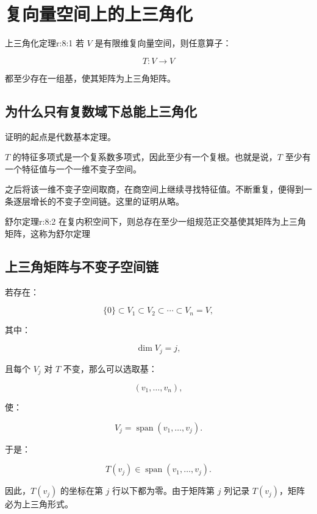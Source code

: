 
\chapter{复向量空间上的上三角化}


\begin{jthm}{上三角化定理}{r:8:1}
若 $V$ 是有限维复向量空间，则任意算子：

\[
T:V\to V
\]

都至少存在一组基，使其矩阵为上三角矩阵。
\end{jthm}

\section{为什么只有复数域下总能上三角化}

证明的起点是代数基本定理。

$T$ 的特征多项式是一个复系数多项式，因此至少有一个复根。也就是说，$T$ 至少有一个特征值与一个一维不变子空间。

之后将该一维不变子空间取商，在商空间上继续寻找特征值。不断重复，便得到一条逐层增长的不变子空间链。这里的证明从略。

\begin{jthm}{舒尔定理}{r:8:2}
在复内积空间下，则总存在至少一组规范正交基使其矩阵为上三角矩阵，这称为舒尔定理
\end{jthm}

\section{上三角矩阵与不变子空间链}

若存在：

\[
\{0\}\subset V_1\subset V_2\subset\cdots\subset V_n=V,
\]

其中：

\[
\dim V_j=j,
\]

且每个 $V_j$ 对 $T$ 不变，那么可以选取基：

\[
(v_1,\ldots,v_n),
\]

使：

\[
V_j=\operatorname{span}(v_1,\ldots,v_j).
\]

于是：

\[
T(v_j)\in\operatorname{span}(v_1,\ldots,v_j).
\]

因此，$T(v_j)$ 的坐标在第 $j$ 行以下都为零。由于矩阵第 $j$ 列记录 $T(v_j)$，矩阵必为上三角形式。

